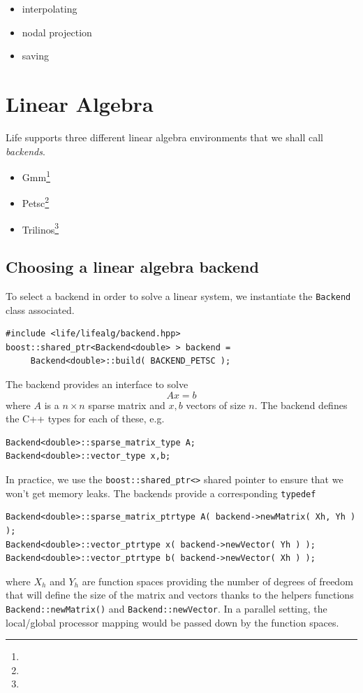 \documentclass[a4paper]{book}
\newcommand{\cpp}{C{\hspace{-.3em}\vspace{-.2em}\tiny++}\xspace}
\newcommand{\life}{Life\xspace}
\begin{document}
\begin{itemize}
\item interpolating
\item nodal projection
\item saving
\end{itemize}


\section{Linear Algebra}
\label{sec:linear-algebra}


\life supports three different linear algebra environments that we
shall call \emph{backends}.
\begin{itemize}
\item Gmm\footnote{}
\item Petsc\footnote{}
\item Trilinos\footnote{}
\end{itemize}


\subsection{Choosing a linear algebra backend}
\label{sec:choos-line-algebra}

To select a backend in order to solve a linear system, we instantiate
the \lstinline!Backend! class associated.

\begin{lstlisting}
#include <life/lifealg/backend.hpp>
boost::shared_ptr<Backend<double> > backend =
     Backend<double>::build( BACKEND_PETSC );
\end{lstlisting}

The backend provides an interface to solve
\begin{equation}
  \label{eq:8}
  A x = b
\end{equation}
\noindent
where $A$ is a $n \times n $ sparse matrix and $x,b$ vectors of size $n$.
The backend defines the \cpp types for  each of these, e.g.
\begin{lstlisting}
Backend<double>::sparse_matrix_type A;
Backend<double>::vector_type x,b;
\end{lstlisting}
\noindent
In practice, we use the \lstinline!boost::shared_ptr<>! shared pointer
to ensure that we won't get memory leaks. The backends provide a
corresponding \lstinline!typedef!


\begin{lstlisting}
Backend<double>::sparse_matrix_ptrtype A( backend->newMatrix( Xh, Yh ) );
Backend<double>::vector_ptrtype x( backend->newVector( Yh ) );
Backend<double>::vector_ptrtype b( backend->newVector( Xh ) );
\end{lstlisting}
\noindent
where $X_h$ and $Y_h$ are function spaces providing the number of
degrees of freedom that will define the size of the matrix and vectors
thanks to the helpers functions \lstinline!Backend::newMatrix()! and
\lstinline!Backend::newVector!. In a parallel setting, the
local/global processor mapping would be passed down by the function
spaces.
\end{document}
